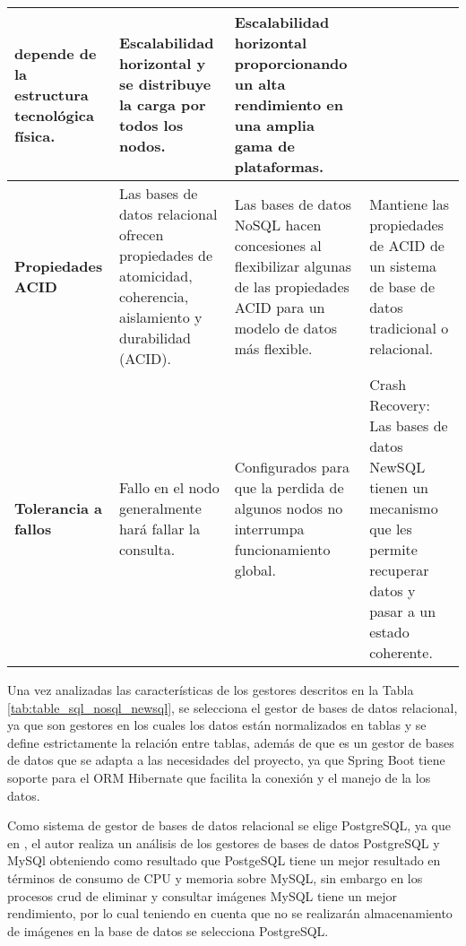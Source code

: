 \begin{spacing}{1}
\begin{center}
\begin{longtable}[c]{ |>{\bfseries}p{}| p{}| p{}|  p{}|  }
            depende de la estructura
            tecnológica física.
            & Escalabilidad horizontal y
            se distribuye la carga por
            todos los nodos.
            & Escalabilidad horizontal
            proporcionando un alta
            rendimiento en una amplia
            gama de plataformas. \\
            \hline
            Propiedades ACID & Las bases de datos relacional
            ofrecen propiedades de
            atomicidad, coherencia,
            aislamiento y durabilidad
            (ACID). & Las bases de datos
            NoSQL hacen
            concesiones al
            flexibilizar algunas de las
            propiedades ACID para
            un modelo de datos más
            flexible.
            & Mantiene las propiedades
            de ACID de un sistema de
            base de datos tradicional o
            relacional. \\
            \hline
            Tolerancia a fallos & Fallo en el nodo generalmente
            hará fallar la consulta.
            & Configurados para que
            la perdida de algunos
            nodos no interrumpa
            funcionamiento global.
            & Crash Recovery: Las
            bases de datos NewSQL
            tienen un mecanismo
            que les permite recuperar
            datos y pasar a un estado
            coherente.\\
            \hline
        \end{longtable}

    \end{center}
\end{spacing}

Una vez analizadas las características de los gestores descritos en la Tabla \ref{tab:table_sql_nosql_newsql}, se selecciona el gestor de bases de datos relacional, ya que son gestores en los cuales los datos están normalizados en tablas y se define estrictamente la relación entre tablas, además de que es un gestor de bases de datos que se adapta a las necesidades del proyecto, ya que Spring Boot tiene soporte para el ORM Hibernate que facilita la conexión y el manejo de la los datos.

\bigbreak

Como sistema de gestor de bases de datos relacional se elige PostgreSQL, ya que en \cite{leon_soberon_alisis_2020}, el autor realiza un análisis de los gestores de bases de datos PostgreSQL y MySQl obteniendo como resultado que PostgeSQL tiene un mejor resultado en términos de consumo de CPU y memoria sobre MySQL, sin embargo en los procesos crud de eliminar y consultar imágenes MySQL tiene un mejor rendimiento, por lo cual teniendo en cuenta que no se realizarán almacenamiento de imágenes en la base de datos se selecciona PostgreSQL.